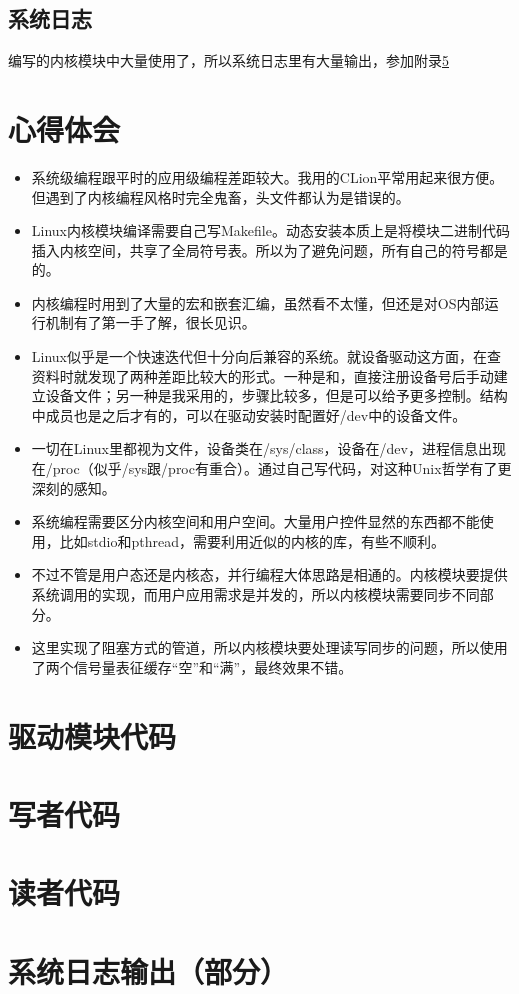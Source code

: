 \documentclass{article}
\begin{document}
\subsection{系统日志}
编写的内核模块中大量使用了，所以系统日志里有大量输出，参加附录\ref{app:log}

\section{心得体会}
\begin{itemize}
    \item 系统级编程跟平时的应用级编程差距较大。我用的CLion平常用起来很方便。但遇到了内核编程风格时完全鬼畜，头文件都认为是错误的。
    \item Linux内核模块编译需要自己写Makefile。动态安装本质上是将模块二进制代码插入内核空间，共享了全局符号表。所以为了避免问题，所有自己的符号都是的。
    \item 内核编程时用到了大量的宏和嵌套汇编，虽然看不太懂，但还是对OS内部运行机制有了第一手了解，很长见识。
    \item Linux似乎是一个快速迭代但十分向后兼容的系统。就设备驱动这方面，在查资料时就发现了两种差距比较大的形式。一种是和，直接注册设备号后手动建立设备文件；另一种是我采用的，步骤比较多，但是可以给予更多控制。结构中成员也是之后才有的，可以在驱动安装时配置好/dev中的设备文件。
    \item 一切在Linux里都视为文件，设备类在/sys/class，设备在/dev，进程信息出现在/proc（似乎/sys跟/proc有重合）。通过自己写代码，对这种Unix哲学有了更深刻的感知。
    \item 系统编程需要区分内核空间和用户空间。大量用户控件显然的东西都不能使用，比如stdio和pthread，需要利用近似的内核的库，有些不顺利。
    \item 不过不管是用户态还是内核态，并行编程大体思路是相通的。内核模块要提供系统调用的实现，而用户应用需求是并发的，所以内核模块需要同步不同部分。
    \item 这里实现了阻塞方式的管道，所以内核模块要处理读写同步的问题，所以使用了两个信号量表征缓存“空”和“满”，最终效果不错。
\end{itemize}

\newpage
\begin{appendix}
\section{驱动模块代码}

\section{写者代码}

\section{读者代码}

\section{系统日志输出（部分）}
\label{app:log}


\end{appendix}
\end{document}
